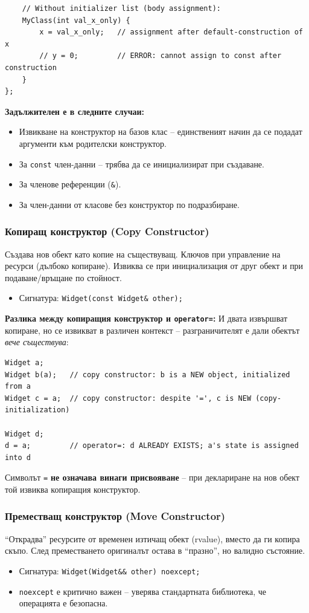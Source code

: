 \documentclass{scrartcl}
\begin{document}
\begin{FlushLeft}
\begin{lstlisting}
    // Without initializer list (body assignment):
    MyClass(int val_x_only) {
        x = val_x_only;   // assignment after default-construction of x
        // y = 0;         // ERROR: cannot assign to const after construction
    }
};
\end{lstlisting}

\textbf{Задължителен е в следните случаи:}
\begin{itemize}
    \item Извикване на конструктор на базов клас -- единственият начин да се подадат аргументи към родителски конструктор.
    \item За \texttt{const} член-данни -- трябва да се инициализират при създаване.
    \item За членове референции (\texttt{\&}).
    \item За член-данни от класове без конструктор по подразбиране.
\end{itemize}

\subsubsection{Копиращ конструктор (Copy Constructor)}
Създава нов обект като копие на съществуващ. Ключов при управление на ресурси (дълбоко копиране). Извиква се при инициализация от друг обект и при подаване/връщане по стойност.
\begin{itemize}
    \item Сигнатура: \texttt{Widget(const Widget\& other);}
\end{itemize}

\textbf{Разлика между копиращия конструктор и \texttt{operator=}:} И двата извършват копиране, но се извикват в различен контекст -- разграничителят е дали обектът \textit{вече съществува}:

\begin{lstlisting}
Widget a;
Widget b(a);   // copy constructor: b is a NEW object, initialized from a
Widget c = a;  // copy constructor: despite '=', c is NEW (copy-initialization)

Widget d;
d = a;         // operator=: d ALREADY EXISTS; a's state is assigned into d
\end{lstlisting}

Символът \texttt{=} \textbf{не означава винаги присвояване} -- при деклариране на нов обект той извиква копиращия конструктор.

\subsubsection{Преместващ конструктор (Move Constructor)}
``Открадва'' ресурсите от временен изтичащ обект (rvalue), вместо да ги копира скъпо. След преместването оригиналът остава в ``празно'', но валидно състояние.
\begin{itemize}
    \item Сигнатура: \texttt{Widget(Widget\&\& other) noexcept;}
    \item \texttt{noexcept} е критично важен -- уверява стандартната библиотека, че операцията е безопасна.
\end{itemize}


\end{FlushLeft}
\end{document}
